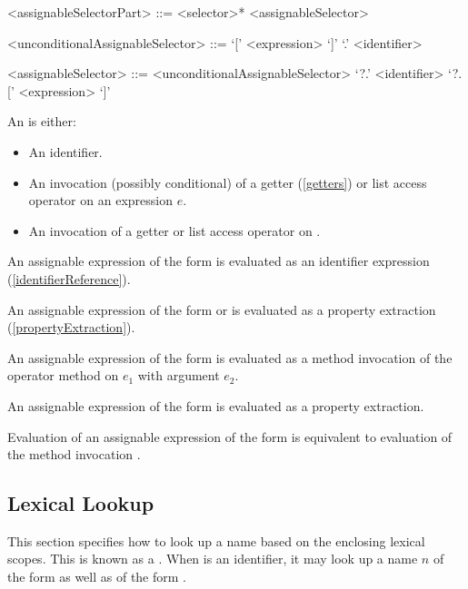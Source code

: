 \documentclass[makeidx]{article}
\begin{document}
{\begin{grammar}
<assignableSelectorPart> ::= <selector>* <assignableSelector>

<unconditionalAssignableSelector> ::= `[' <expression> `]'
  \alt `.' <identifier>

<assignableSelector> ::= <unconditionalAssignableSelector>
  \alt `?.' <identifier>
  \alt `?.[' <expression> `]'

\end{grammar}

\LMHash{}%
An  is either:
\begin{itemize}
\item An identifier.
\item An invocation (possibly conditional) of a getter (\ref{getters}) or list access operator on an expression $e$.
\item An invocation of a getter or list access operator on \SUPER{}.
\end{itemize}

\LMHash{}%
An assignable expression of the form \id{} is evaluated as an identifier expression (\ref{identifierReference}).


\LMHash{}%
An assignable expression of the form  or  is evaluated as a property extraction (\ref{propertyExtraction}).

\LMHash{}%
An assignable expression of the form  is evaluated as a method invocation of the operator method \code{[]} on $e_1$ with argument $e_2$.

\LMHash{}%
An assignable expression of the form  is evaluated as a property extraction.

\LMHash{}%
Evaluation of an assignable expression of the form \code{\SUPER{}[$e_2$]} is equivalent to evaluation of the method invocation .


\subsection{Lexical Lookup}

\LMHash{}%
This section specifies how to look up a name
based on the enclosing lexical scopes.
This is known as a .
When \id{} is an identifier,
it may look up a name $n$ of the form \id{} as well as of the form \code{\id=}.

}
\end{document}
